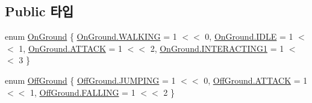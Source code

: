\subsection*{Public 타입}
\begin{DoxyCompactItemize}
\item 
enum \mbox{\hyperlink{class_state_ab9eb1c1d81f1903b8486d1275e78b68e}{On\+Ground}} \{ \mbox{\hyperlink{class_state_ab9eb1c1d81f1903b8486d1275e78b68ea606c114184493a665cf1f6a12fbab9d3}{On\+Ground.\+W\+A\+L\+K\+I\+NG}} = 1 $<$$<$ 0, 
\mbox{\hyperlink{class_state_ab9eb1c1d81f1903b8486d1275e78b68eaa5daf7f2ebbba4975d61dab1c40188c7}{On\+Ground.\+I\+D\+LE}} = 1 $<$$<$ 1, 
\mbox{\hyperlink{class_state_ab9eb1c1d81f1903b8486d1275e78b68eac6ddd0f72ff2fd344693b9ca8d483871}{On\+Ground.\+A\+T\+T\+A\+CK}} = 1 $<$$<$ 2, 
\mbox{\hyperlink{class_state_ab9eb1c1d81f1903b8486d1275e78b68ea0f85e9fa4c9d9011849fd3bfcae6a2c0}{On\+Ground.\+I\+N\+T\+E\+R\+A\+C\+T\+I\+N\+G1}} = 1 $<$$<$ 3
 \}
\item 
enum \mbox{\hyperlink{class_state_a7d945e793324c017a973205564cf1a56}{Off\+Ground}} \{ \mbox{\hyperlink{class_state_a7d945e793324c017a973205564cf1a56a6de49bfda8068b7bc3b0c0e3d2e43134}{Off\+Ground.\+J\+U\+M\+P\+I\+NG}} = 1 $<$$<$ 0, 
\mbox{\hyperlink{class_state_a7d945e793324c017a973205564cf1a56ac6ddd0f72ff2fd344693b9ca8d483871}{Off\+Ground.\+A\+T\+T\+A\+CK}} = 1 $<$$<$ 1, 
\mbox{\hyperlink{class_state_a7d945e793324c017a973205564cf1a56a4f9d4539ac1e11a251e2afe022eba4e6}{Off\+Ground.\+F\+A\+L\+L\+I\+NG}} = 1 $<$$<$ 2
 \}
\end{DoxyCompactItemize}
